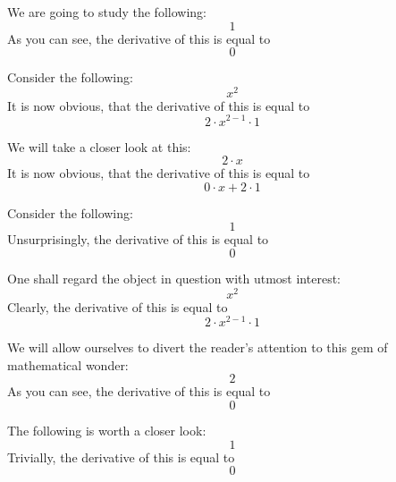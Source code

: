 \documentclass{article}
\begin{document}
We are going to study the following:
\begin{equation}
1 
\end{equation}
As you can see, the derivative of this is equal to
\begin{equation}
0 
\end{equation}

Consider the following:
\begin{equation}
x ^{2 } 
\end{equation}
It is now obvious, that the derivative of this is equal to
\begin{equation}
2 \cdot x ^{2 - 1 } \cdot 1 
\end{equation}

We will take a closer look at this:
\begin{equation}
2 \cdot x 
\end{equation}
It is now obvious, that the derivative of this is equal to
\begin{equation}
0 \cdot x + 2 \cdot 1 
\end{equation}

Consider the following:
\begin{equation}
1 
\end{equation}
Unsurprisingly, the derivative of this is equal to
\begin{equation}
0 
\end{equation}

One shall regard the object in question with utmost interest:
\begin{equation}
x ^{2 } 
\end{equation}
Clearly, the derivative of this is equal to
\begin{equation}
2 \cdot x ^{2 - 1 } \cdot 1 
\end{equation}

We will allow ourselves to divert the reader's attention to this gem of mathematical wonder:
\begin{equation}
2 
\end{equation}
As you can see, the derivative of this is equal to
\begin{equation}
0 
\end{equation}

The following is worth a closer look:
\begin{equation}
1 
\end{equation}
Trivially, the derivative of this is equal to
\begin{equation}
0 
\end{equation}
\end{document}
